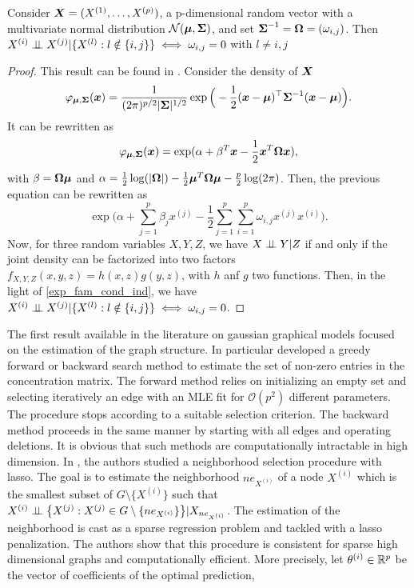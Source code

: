 \begin{lemma}
Consider $\boldsymbol X=(X^{(1)},\dots,X^{(p)})$, a p-dimensional random vector with a multivariate normal distribution $\mathcal N(\boldsymbol\mu, \boldsymbol\Sigma)$, and set $\boldsymbol\Sigma^{-1}=\boldsymbol\Omega=(\omega_{i,j})$. Then $X^{(i)} \perp\!\!\!\perp X^{(j)}|\{X^{(l)}: l\notin\{i,j\}\} \iff \omega_{i,j}=0$ with $l\neq i,j$ 
\end{lemma}
\begin{proof}
This result can be found in \citep{edwards2000introduction}. Consider the density of $\boldsymbol X$
\begin{equation}
  \varphi_{\boldsymbol\mu,\boldsymbol\Sigma}(\boldsymbol x)=\frac{1}{(2\pi)^{p/2}|\boldsymbol\Sigma|^{1/2}} \exp\Big(-\frac{1}{2}(\boldsymbol x-\boldsymbol\mu)^\top\boldsymbol\Sigma^{-1}(\boldsymbol x-\boldsymbol\mu)\Big).
\end{equation}
It can be rewritten as
\begin{equation}
  \varphi_{\boldsymbol\mu,\boldsymbol\Sigma}(\boldsymbol x) = \exp(\alpha + \beta^T\boldsymbol x-\frac{1}{2}\boldsymbol x^T\boldsymbol\Omega\boldsymbol x),
\end{equation}
with $\beta=\boldsymbol\Omega\boldsymbol\mu$ and $\alpha=\frac{1}{2}\log(|\boldsymbol\Omega|)-\frac{1}{2}\boldsymbol\mu^T\boldsymbol\Omega\boldsymbol\mu-\frac{p}{2}\log(2\pi)$. Then, the previous equation can be rewritten as 
\begin{equation}
\label{exp_fam_cond_ind}
  \exp\big(\alpha + \sum_{j=1}^p\beta_jx^{(j)}-\frac{1}{2}\sum_{j=1}^p\sum_{i=1}^p\omega_{i,j}x^{(j)}x^{(i)}\big).
\end{equation}
Now, for three random variables $X,Y,Z$, we have $X \perp\!\!\!\perp Y|Z$ if and only if the joint density can be factorized into two factors $f_{X,Y,Z}(x,y,z)=h(x,z)g(y,z)$, with $h$ anf $g$ two functions. Then, in the light of  \cref{exp_fam_cond_ind}, we have $X^{(i)}\perp\!\!\!\perp X^{(j)}|\{X^{(l)}: l\notin\{i,j\}\} \iff \omega_{i,j}=0$.
\end{proof}
The first result available in the literature on gaussian graphical models focused on the estimation of the graph structure. In particular \citep{dempster1972cov_select} developed a greedy forward or backward search method to estimate the set of non-zero entries in the concentration matrix. The forward method relies on initializing an empty set and selecting iteratively an edge with an MLE fit for $\mathcal{O}(p^2)$ different parameters. The procedure stops according to a suitable selection criterion. The backward method proceeds in the same manner by starting with all edges and operating deletions. It is obvious that such methods are computationally intractable in high dimension. In \citep{meinshausen2006}, the authors studied a neighborhood selection procedure with lasso. The goal is to estimate the neighborhood $ne_{X^{(i)}}$ of a node $X^{(i)}$ which is the smallest subset of $G\setminus\{X^{(i)}\}$ such that $X^{(i)} \perp\!\!\!\perp \big\{X^{(j)}: X^{(j)}\in G\setminus\{ne_{X^{(i)}}\}\big\} | X_{ne_{X^{(i)}}}$. The estimation of the neighborhood is cast as a sparse regression problem and tackled with a lasso penalization. The authors show that this procedure is consistent for sparse high dimensional graphs and computationally efficient. More precisely, let $\theta^{(i)} \in {\mathbb R} ^p$ be the vector of coefficients of the optimal prediction,
